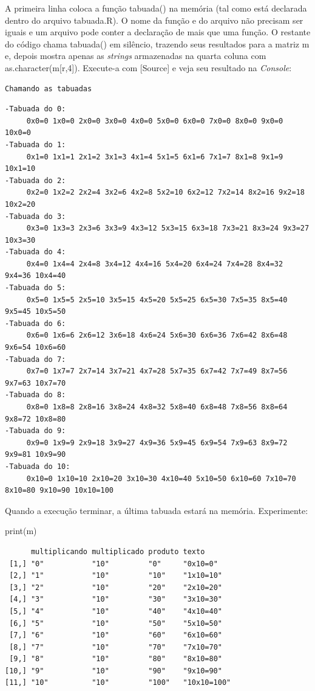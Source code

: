 \documentclass[
]{article}
\newenvironment{Shaded}{\begin{snugshade}}{\end{snugshade}}
\newcommand{\FunctionTok}[1]{\textcolor[rgb]{0.00,0.00,0.00}{#1}}
\newcommand{\NormalTok}[1]{#1}
\begin{document}
A primeira linha coloca a função tabuada() na memória (tal como está
declarada dentro do arquivo tabuada.R). O nome da função e do arquivo
não precisam ser iguais e um arquivo pode conter a declaração de mais
que uma função. O restante do código chama tabuada() em silêncio,
trazendo seus resultados para a matriz m e, depois mostra apenas as
\emph{strings} armazenadas na quarta coluna com
as.character(m{[}r,4{]}). Execute-a com {[}Source{]} e veja seu
resultado na \emph{Console}:

\begin{verbatim}
Chamando as tabuadas
\end{verbatim}

\begin{verbatim}
-Tabuada do 0:
     0x0=0 1x0=0 2x0=0 3x0=0 4x0=0 5x0=0 6x0=0 7x0=0 8x0=0 9x0=0 10x0=0 
-Tabuada do 1:
     0x1=0 1x1=1 2x1=2 3x1=3 4x1=4 5x1=5 6x1=6 7x1=7 8x1=8 9x1=9 10x1=10 
-Tabuada do 2:
     0x2=0 1x2=2 2x2=4 3x2=6 4x2=8 5x2=10 6x2=12 7x2=14 8x2=16 9x2=18 10x2=20 
-Tabuada do 3:
     0x3=0 1x3=3 2x3=6 3x3=9 4x3=12 5x3=15 6x3=18 7x3=21 8x3=24 9x3=27 10x3=30 
-Tabuada do 4:
     0x4=0 1x4=4 2x4=8 3x4=12 4x4=16 5x4=20 6x4=24 7x4=28 8x4=32 9x4=36 10x4=40 
-Tabuada do 5:
     0x5=0 1x5=5 2x5=10 3x5=15 4x5=20 5x5=25 6x5=30 7x5=35 8x5=40 9x5=45 10x5=50 
-Tabuada do 6:
     0x6=0 1x6=6 2x6=12 3x6=18 4x6=24 5x6=30 6x6=36 7x6=42 8x6=48 9x6=54 10x6=60 
-Tabuada do 7:
     0x7=0 1x7=7 2x7=14 3x7=21 4x7=28 5x7=35 6x7=42 7x7=49 8x7=56 9x7=63 10x7=70 
-Tabuada do 8:
     0x8=0 1x8=8 2x8=16 3x8=24 4x8=32 5x8=40 6x8=48 7x8=56 8x8=64 9x8=72 10x8=80 
-Tabuada do 9:
     0x9=0 1x9=9 2x9=18 3x9=27 4x9=36 5x9=45 6x9=54 7x9=63 8x9=72 9x9=81 10x9=90 
-Tabuada do 10:
     0x10=0 1x10=10 2x10=20 3x10=30 4x10=40 5x10=50 6x10=60 7x10=70 8x10=80 9x10=90 10x10=100 
\end{verbatim}

Quando a execução terminar, a última tabuada estará na memória.
Experimente:

\begin{Shaded}
\begin{Highlighting}[]
\FunctionTok{print}\NormalTok{(m)}
\end{Highlighting}
\end{Shaded}

\begin{verbatim}
      multiplicando multiplicado produto texto      
 [1,] "0"           "10"         "0"     "0x10=0"   
 [2,] "1"           "10"         "10"    "1x10=10"  
 [3,] "2"           "10"         "20"    "2x10=20"  
 [4,] "3"           "10"         "30"    "3x10=30"  
 [5,] "4"           "10"         "40"    "4x10=40"  
 [6,] "5"           "10"         "50"    "5x10=50"  
 [7,] "6"           "10"         "60"    "6x10=60"  
 [8,] "7"           "10"         "70"    "7x10=70"  
 [9,] "8"           "10"         "80"    "8x10=80"  
[10,] "9"           "10"         "90"    "9x10=90"  
[11,] "10"          "10"         "100"   "10x10=100"
\end{verbatim}
\end{document}
